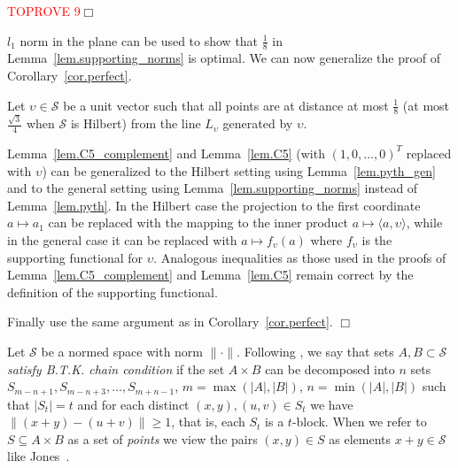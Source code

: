 \documentclass{article}
\newenvironment{proof}{\noindent{\bf Proof}}{\hspace*{\fill}$\Box$}
\newenvironment{proofof}[1]{\noindent {\bf Proof of #1}}{\hspace*{\fill}$\Box$}
\begin{document}
\begin{proof}\textcolor{red}{TOPROVE 9}\end{proof}

\medskip

$l_1$ norm in the plane can be used to show that $\frac 1 8$ in Lemma~\ref{lem.supporting_norms} is optimal. 
We can now generalize the proof of Corollary~\ref{cor.perfect}.

\medskip

\begin{proofof}{Lemma~\ref{lem.perfect_gen}}
    Let $\upsilon \in \mathcal{S}$ be a unit vector such that all points are at distance at most $\frac 1 8$ (at most $\frac {\sqrt 3} 4$ when $\mathcal{S}$ is Hilbert) from 
    the line $L_{\upsilon}$ generated by $\upsilon$. 
 
Lemma~\ref{lem.C5_complement} and Lemma~\ref{lem.C5} (with $(1,0,\dots,0)^T$ replaced with $\upsilon$)
    can be generalized to the Hilbert setting using Lemma~\ref{lem.pyth_gen} and to the general setting using Lemma~\ref{lem.supporting_norms} instead of Lemma~\ref{lem.pyth}. In the Hilbert case the projection to the first coordinate $a \mapsto a_1$ can be replaced with the mapping to the inner product $a \mapsto \langle a, \upsilon \rangle$, while in the general case it can be replaced with $a \mapsto f_\upsilon(a)$ where $f_\upsilon$ is the supporting functional for $\upsilon$. Analogous inequalities as those used in the proofs of Lemma~\ref{lem.C5_complement} and Lemma~\ref{lem.C5}
    remain correct by the definition of the supporting functional.

    Finally use the same argument as in Corollary~\ref{cor.perfect}.
\end{proofof}

\medskip


Let $\mathcal{S}$ be a normed space with norm $\|\cdot\|$.
Following \cite{jones, LR}, we say that sets $A, B \subset \mathcal{S}$ \emph{satisfy B.T.K. chain condition} if
the set $A \times B$ can be decomposed into $n$ sets $S_{m-n+1}, S_{m-n+3}, \dots, S_{m+n-1}$,
$m=\max(|A|, |B|)$, $n=\min(|A|, |B|)$
such that $|S_t|=t$ and for each distinct 
$(x, y), (u, v) \in S_t$ we have $\|(x+y) - (u+v)\| \ge 1$, that is, each $S_t$ is a $t$-block.
When we refer to $S \subseteq A \times B$ as a set of \emph{points} we view the pairs $(x,y) \in S$ as elements $x+y \in \mathcal{S}$
like Jones~\cite{jones}. 
\end{document}
